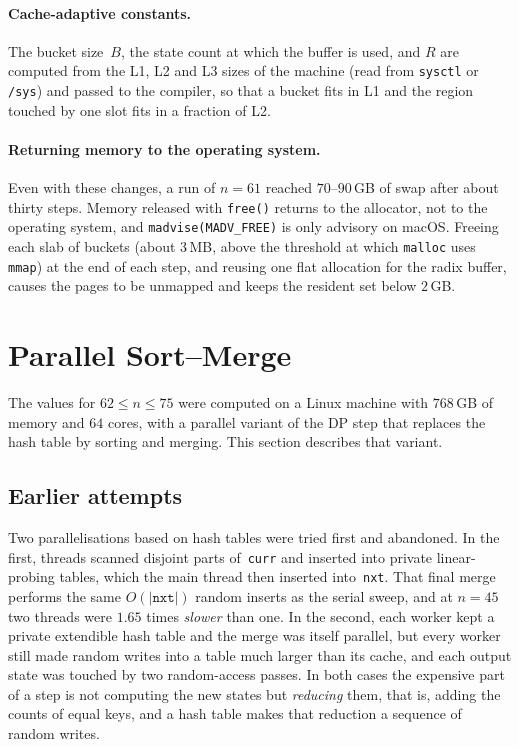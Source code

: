 \documentclass[12pt]{article}
\theoremstyle{definition}
\newcommand{\nxt}{\texttt{nxt}}
\newcommand{\curr}{\texttt{curr}}
\begin{document}
\paragraph{Cache-adaptive constants.}
The bucket size~$B$, the state count at which the buffer is used, and $R$
are computed from the L1, L2 and L3 sizes of the machine (read from
\texttt{sysctl} or \texttt{/sys}) and passed to the compiler, so that a bucket
fits in L1 and the region touched by one slot fits in a fraction of L2.

\paragraph{Returning memory to the operating system.}
Even with these changes, a run of $n=61$ reached $70$--$90$\,GB of swap
after about thirty steps.
Memory released with \texttt{free()} returns to the allocator, not to the
operating system, and \texttt{madvise(MADV\_FREE)} is only advisory on macOS.
Freeing each slab of buckets (about $3$\,MB, above the threshold at which
\texttt{malloc} uses \texttt{mmap}) at the end of each step, and reusing one
flat allocation for the radix buffer, causes the pages to be unmapped and
keeps the resident set below $2$\,GB.

\section{Parallel Sort--Merge}
\label{sec:sm}

The values for $62\le n\le 75$ were computed on a Linux machine with
$768$\,GB of memory and $64$ cores, with a parallel variant of the DP step
that replaces the hash table by sorting and merging.
This section describes that variant.

\subsection{Earlier attempts}

Two parallelisations based on hash tables were tried first and abandoned.
In the first, threads scanned disjoint parts of~\curr{} and inserted into
private linear-probing tables, which the main thread then inserted
into~\nxt.
That final merge performs the same $O(|\nxt|)$ random inserts as the serial
sweep, and at $n=45$ two threads were $1.65$ times \emph{slower} than one.
In the second, each worker kept a private extendible hash table and the
merge was itself parallel, but every worker still made random writes into a
table much larger than its cache, and each output state was touched by two
random-access passes.
In both cases the expensive part of a step is not computing the new states
but \emph{reducing} them, that is, adding the counts of equal keys, and a
hash table makes that reduction a sequence of random writes.
\end{document}
